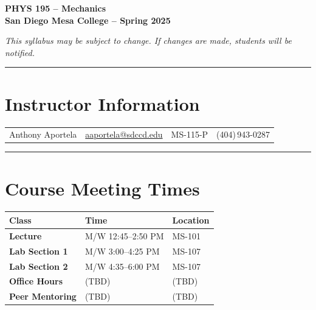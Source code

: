 \documentclass[12pt]{article}
\begin{document}
\begin{center}
{\LARGE \textbf{PHYS 195 -- Mechanics}}\\[4pt]
\textbf{San Diego Mesa College -- Spring 2025}\\[2pt]
\end{center}

\noindent
\emph{This syllabus may be subject to change. 
If changes are made, students will be notified.}
\medskip

\hrule

\section*{Instructor Information}

\begin{center}
\begin{tabularx}{\textwidth}{@{} 
                            >{\centering\arraybackslash}X
                          | >{\centering\arraybackslash}X
                          | >{\centering\arraybackslash}X
                          | >{\centering\arraybackslash}X@{}}
Anthony Aportela &
\href{mailto:aaportela@sdccd.edu}{aaportela@sdccd.edu} &
MS-115-P &
(404)\,943-0287 \\
\end{tabularx}
\end{center}

\hrule

\section*{Course Meeting Times}

\begin{center}
\begin{tabularx}{\textwidth}{| >{\arraybackslash}X
                              | >{\centering\arraybackslash}X
                              | >{\raggedleft\arraybackslash}X |}
\hline
\textbf{Class}          & \textbf{Time}              & \textbf{Location} \\ \hline
\textbf{Lecture}        & M/W 12:45--2:50 PM         & MS-101            \\ \hline
\textbf{Lab Section 1}  & M/W 3:00--4:25 PM          & MS-107            \\ \hline
\textbf{Lab Section 2}  & M/W 4:35--6:00 PM          & MS-107            \\ \hline
\textbf{Office Hours}   & (TBD)                      & (TBD)             \\ \hline
\textbf{Peer Mentoring} & (TBD)                      & (TBD)             \\ \hline
\end{tabularx}
\end{center}
\end{document}
